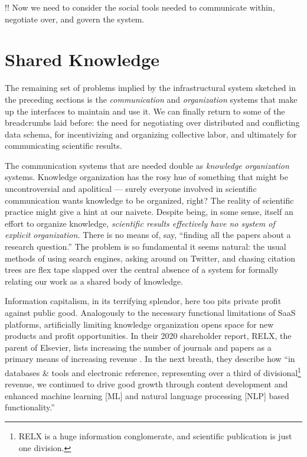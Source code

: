 \documentclass[notoc]{tufte-book}
\begin{document}
!! Now we need to consider the social tools needed to communicate
within, negotiate over, and govern the system.






\section{Shared Knowledge}



 The remaining set of problems implied by the
infrastructural system sketched in the preceding sections is the
\emph{communication} and \emph{organization} systems that make up the
interfaces to maintain and use it. We can finally return to some of the
breadcrumbs laid before: the need for negotiating over distributed and
conflicting data schema, for incentivizing and organizing collective
labor, and ultimately for communicating scientific results.

The communication systems that are needed double as \emph{knowledge
organization} systems. Knowledge organization has the rosy hue of
something that might be uncontroversial and apolitical --- surely
everyone involved in scientific communication wants knowledge to be
organized, right? The reality of scientific practice might give a hint
at our naivete. Despite being, in some sense, itself an effort to
organize knowledge, \emph{scientific results effectively have no system
of explicit organization.} There is no means of, say, ``finding all the
papers about a research question.'' The problem is so fundamental it
seems natural: the usual methods of using search engines, asking around
on Twitter, and chasing citation trees are flex tape slapped over the
central absence of a system for formally relating our work as a shared
body of knowledge.

Information capitalism, in its terrifying splendor, here too pits
private profit against public good. Analogously to the necessary
functional limitations of SaaS platforms, artificially limiting
knowledge organization opens space for new products and profit
opportunities. In their 2020 shareholder report, RELX, the parent of
Elsevier, lists increasing the number of journals and papers as a
primary means of increasing revenue \citep{RELXAnnualReport2020} .
In the next breath, they describe how ``in databases \& tools and
electronic reference, representing over a third of divisional\footnote{RELX
  is a huge information conglomerate, and scientific publication is just
  one division.} revenue, we continued to drive good growth through
content development and enhanced machine learning {[}ML{]} and natural
language processing {[}NLP{]} based functionality.''
\end{document}
